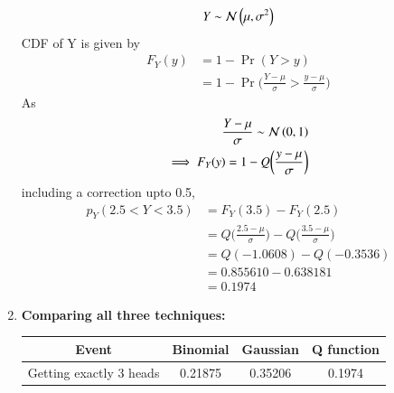 \documentclass[journal,12pt,twocolumn]{IEEEtran}
\theoremstyle{remark}
\begin{document}
\begin{enumerate}
\begin{align}
	Y \sim \mathcal{N}\left(\mu,\sigma^2\right)
\end{align}
CDF of Y is given by
\begin{align}
	F_Y(y) &= 1 - \Pr(Y>y)\\
	&= 1 - \Pr\biggl(\frac{Y-\mu}{\sigma}>\frac{y-\mu}{\sigma}\biggr)
\end{align}
As
\begin{align}
	\frac{Y-\mu}{\sigma} \sim \mathcal{N}\left(0,1\right)\\
	\implies F_Y(y) = 1 - Q\biggl(\frac{y-\mu}{\sigma}\biggr)
\end{align}
including a correction upto 0.5,
\begin{align}
	p_Y(2.5<Y<3.5) & = F_Y(3.5) - F_Y(2.5)\\
	&= Q\biggl( \frac{2.5-\mu}{\sigma} \biggr) - Q\biggl( \frac{3.5-\mu}{\sigma} \biggr)\\
	&= Q(-1.0608) - Q(-0.3536)\\
	&= 0.855610 - 0.638181\\
	&= 0.1974
\end{align}

\item \textbf{Comparing all three techniques:}\\
\begin{table}[H]
\def\arraystretch{1.2}
\begin{tabular}{|c|c|c|c|}
	\hline
	\textbf{Event} &\textbf{Binomial} &\textbf{Gaussian} &\textbf{Q function}\\ 
	\hline
	Getting exactly 3 heads &0.21875 &0.35206 &0.1974\\ 
	\hline
\end{tabular}
\end{table}
\end{enumerate}
\end{document}
